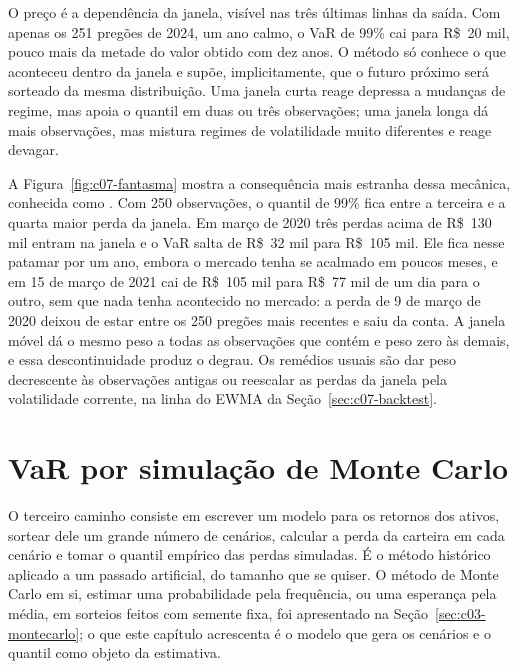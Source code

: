 O preço é a dependência da janela, visível nas três últimas linhas da saída. Com apenas os 251 pregões de 2024, um ano calmo, o VaR de 99\% cai para R\$~20 mil, pouco mais da metade do valor obtido com dez anos. O método só conhece o que aconteceu dentro da janela e supõe, implicitamente, que o futuro próximo será sorteado da mesma distribuição. Uma janela curta reage depressa a mudanças de regime, mas apoia o quantil em duas ou três observações; uma janela longa dá mais observações, mas mistura regimes de volatilidade muito diferentes e reage devagar.


A Figura~\ref{fig:c07-fantasma} mostra a consequência mais estranha dessa mecânica, conhecida como . Com 250 observações, o quantil de 99\% fica entre a terceira e a quarta maior perda da janela. Em março de 2020 três perdas acima de R\$~130 mil entram na janela e o VaR salta de R\$~32 mil para R\$~105 mil. Ele fica nesse patamar por um ano, embora o mercado tenha se acalmado em poucos meses, e em 15 de março de 2021 cai de R\$~105 mil para R\$~77 mil de um dia para o outro, sem que nada tenha acontecido no mercado: a perda de 9 de março de 2020 deixou de estar entre os 250 pregões mais recentes e saiu da conta. A janela móvel dá o mesmo peso a todas as observações que contém e peso zero às demais, e essa descontinuidade produz o degrau. Os remédios usuais são dar peso decrescente às observações antigas ou reescalar as perdas da janela pela volatilidade corrente, na linha do EWMA da Seção~\ref{sec:c07-backtest}.

\section{VaR por simulação de Monte Carlo}
\label{sec:c07-mc}

O terceiro caminho consiste em escrever um modelo para os retornos dos ativos, sortear dele um grande número de cenários, calcular a perda da carteira em cada cenário e tomar o quantil empírico das perdas simuladas. É o método histórico aplicado a um passado artificial, do tamanho que se quiser. O método de Monte Carlo em si, estimar uma probabilidade pela frequência, ou uma esperança pela média, em sorteios feitos com semente fixa, foi apresentado na Seção~\ref{sec:c03-montecarlo}; o que este capítulo acrescenta é o modelo que gera os cenários e o quantil como objeto da estimativa.

